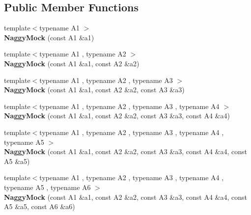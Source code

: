 \subsection*{Public Member Functions}
\begin{DoxyCompactItemize}
\item 
{\footnotesize template$<$typename A1 $>$ }\\{\bfseries Naggy\+Mock} (const A1 \&a1)\hypertarget{classtesting_1_1NaggyMock_ae43ea6c6a6b66fe31cb14f93e0be5718}{}\label{classtesting_1_1NaggyMock_ae43ea6c6a6b66fe31cb14f93e0be5718}

\item 
{\footnotesize template$<$typename A1 , typename A2 $>$ }\\{\bfseries Naggy\+Mock} (const A1 \&a1, const A2 \&a2)\hypertarget{classtesting_1_1NaggyMock_a4241363ab2ca3a2e7baa5ead980175e6}{}\label{classtesting_1_1NaggyMock_a4241363ab2ca3a2e7baa5ead980175e6}

\item 
{\footnotesize template$<$typename A1 , typename A2 , typename A3 $>$ }\\{\bfseries Naggy\+Mock} (const A1 \&a1, const A2 \&a2, const A3 \&a3)\hypertarget{classtesting_1_1NaggyMock_abd9eea0573bf39f4b41504b2d1df5311}{}\label{classtesting_1_1NaggyMock_abd9eea0573bf39f4b41504b2d1df5311}

\item 
{\footnotesize template$<$typename A1 , typename A2 , typename A3 , typename A4 $>$ }\\{\bfseries Naggy\+Mock} (const A1 \&a1, const A2 \&a2, const A3 \&a3, const A4 \&a4)\hypertarget{classtesting_1_1NaggyMock_aa7d63f62600171db931c6bbb4c2a6d52}{}\label{classtesting_1_1NaggyMock_aa7d63f62600171db931c6bbb4c2a6d52}

\item 
{\footnotesize template$<$typename A1 , typename A2 , typename A3 , typename A4 , typename A5 $>$ }\\{\bfseries Naggy\+Mock} (const A1 \&a1, const A2 \&a2, const A3 \&a3, const A4 \&a4, const A5 \&a5)\hypertarget{classtesting_1_1NaggyMock_ac751c8a708935bd8558c9665160f7144}{}\label{classtesting_1_1NaggyMock_ac751c8a708935bd8558c9665160f7144}

\item 
{\footnotesize template$<$typename A1 , typename A2 , typename A3 , typename A4 , typename A5 , typename A6 $>$ }\\{\bfseries Naggy\+Mock} (const A1 \&a1, const A2 \&a2, const A3 \&a3, const A4 \&a4, const A5 \&a5, const A6 \&a6)\hypertarget{classtesting_1_1NaggyMock_aac4c0986e917a5d6e515f8dc0e7bf644}{}\label{classtesting_1_1NaggyMock_aac4c0986e917a5d6e515f8dc0e7bf644}


\end{DoxyCompactItemize}
